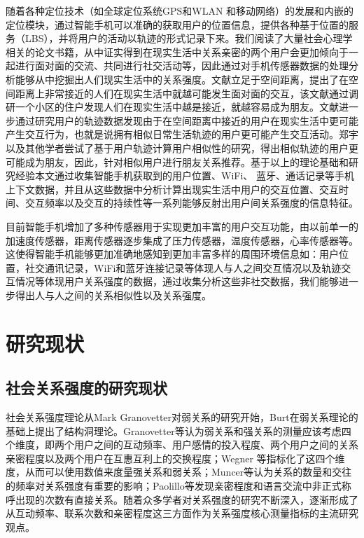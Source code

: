 \par 随着各种定位技术（如全球定位系统GPS和WLAN 和移动网络）的发展和内嵌的定位模块，通过智能手机可以准确的获取用户的位置信息，提供各种基于位置的服务（LBS），并将用户的活动以轨迹的形式记录下来。我们阅读了大量社会心理学相关的论文书籍，从中证实得到在现实生活中关系亲密的两个用户会更加倾向于一起进行面对面的交流、共同进行社交活动等，因此通过对手机传感器数据的处理分析能够从中挖掘出人们现实生活中的关系强度。文献\cite{zillmann2013selective}立足于空间距离，提出了在空间距离上非常接近的人们在现实生活中就越可能发生面对面的交互，该文献通过调研一个小区的住户发现人们在现实生活中越是接近，就越容易成为朋友。文献\cite{zajonc1968attitudinal,zillmann2000mood}进一步通过研究用户的轨迹数据发现由于在空间距离中接近的用户在现实生活中更可能产生交互行为，也就是说拥有相似日常生活轨迹的用户更可能产生交互活动。郑宇 以及其他学者尝试了基于用户轨迹计算用户相似性的研究，得出相似轨迹的用户更可能成为朋友，因此，针对相似用户进行朋友关系推荐。基于以上的理论基础和研究经验本文通过收集智能手机获取到的用户位置、WiFi、 蓝牙、通话记录等手机上下文数据，并且从这些数据中分析计算出现实生活中用户的交互位置、交互时间、交互频率以及交互的持续性等一系列能够反射出用户间关系强度的信息特征。

\par 目前智能手机增加了多种传感器用于实现更加丰富的用户交互功能，由以前单一的加速度传感器，距离传感器逐步集成了压力传感器，温度传感器，心率传感器等。这使得智能手机能够更加准确地感知到更加丰富多样的周围环境信息如：用户位置，社交通讯记录，WiFi和蓝牙连接记录等体现人与人之间交互情况以及轨迹交互情况等体现用户关系强度的数据，通过收集分析这些非社交数据，我们能够进一步得出人与人之间的关系相似性以及关系强度。


\section{研究现状}
\subsection{社会关系强度的研究现状}
社会关系强度理论从Mark Granovetter对弱关系的研究开始，Burt在弱关系理论的基础上提出了结构洞理论。Granovetter等认为弱关系和强关系的测量应该考虑四个维度，即两个用户之间的互动频率、用户感情的投入程度、两个用户之间的关系亲密程度以及两个用户在互惠互利上的交换程度；Wegner 等指标化了这四个维度，从而可以使用数值来度量强关系和弱关系；Muncer等认为关系的数量和交往的频率对关系强度有重要的影响；Paolillo等发现亲密程度和语言交流中非正式称呼出现的次数有直接关系。随着众多学者对关系强度的研究不断深入，逐渐形成了从互动频率、联系次数和亲密程度这三方面作为关系强度核心测量指标的主流研究观点。

